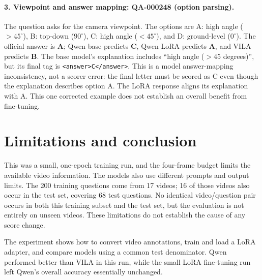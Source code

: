 \documentclass[11pt]{article}
\begin{document}
\paragraph{3. Viewpoint and answer mapping: QA-000248 (option parsing).}
The question asks for the camera viewpoint. The options are A: high angle
($>45^\circ$), B: top-down ($90^\circ$), C: high angle ($<45^\circ$), and
D: ground-level ($0^\circ$). The official answer is \textbf{A}; Qwen base
predicts \textbf{C}, Qwen LoRA predicts \textbf{A}, and VILA predicts
\textbf{B}.
The base model's explanation includes ``high angle ($>45$ degrees)'',
but its final tag is \texttt{<answer>C</answer>}. This is a model
answer-mapping inconsistency, not a scorer error: the final letter must be
scored as C even though the explanation describes option A. The LoRA
response aligns its explanation with A. This one corrected example does
not establish an overall benefit from fine-tuning.

\section{Limitations and conclusion}

This was a small, one-epoch training run, and the four-frame budget limits
the available video information. The models also use different prompts and
output limits. The 200 training questions come from 17 videos; 16 of those
videos also occur in the test set, covering 68 test questions. No identical
video/question pair occurs in both this training subset and the test set,
but the evaluation is not entirely on unseen videos. These limitations do
not establish the cause of any score change.

The experiment shows how to convert video annotations, train and load a
LoRA adapter, and compare models using a common test denominator. Qwen
performed better than VILA in this run, while the small LoRA fine-tuning
run left Qwen's overall accuracy essentially unchanged.
\end{document}
